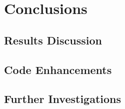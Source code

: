 \chapter{Conclusions}
\label{ch:conclusions}

\section{Results Discussion}
\section{Code Enhancements}
\section{Further Investigations}
